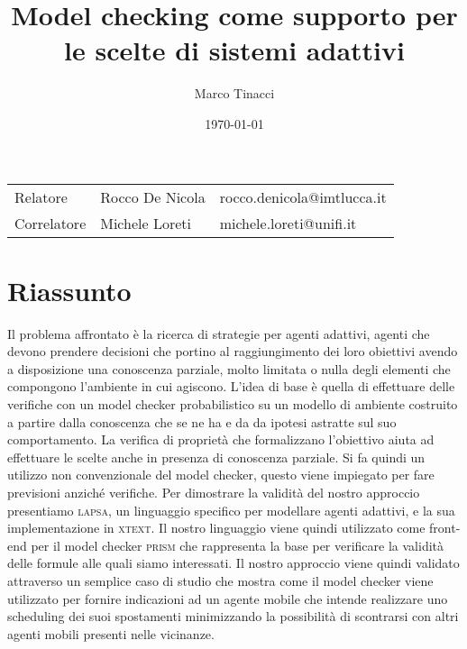 \documentclass[12pt,a4paper]{article}
\author{Marco Tinacci}
\date{\today}
\title{Model checking come supporto per le scelte di sistemi adattivi}
\begin{document}
\maketitle

\begin{tabular}{lll}
	Relatore & Rocco De Nicola & rocco.denicola@imtlucca.it \\
	Correlatore & Michele Loreti & michele.loreti@unifi.it \\
\end{tabular}

\section*{Riassunto}
Il problema affrontato è la ricerca di strategie per agenti adattivi, agenti che devono prendere decisioni che portino al raggiungimento dei loro obiettivi avendo a disposizione una conoscenza parziale, molto limitata o nulla degli elementi che compongono l'ambiente in cui agiscono. L'idea di base è quella di effettuare delle verifiche con un model checker probabilistico su un modello di ambiente costruito a partire dalla conoscenza che se ne ha e da da ipotesi  astratte sul suo comportamento. La verifica di proprietà che formalizzano l'obiettivo aiuta ad effettuare le scelte anche in presenza di conoscenza parziale. Si fa quindi un utilizzo non convenzionale del model checker, questo viene impiegato per fare previsioni anziché verifiche. Per dimostrare la validità del nostro approccio presentiamo \textsc{lapsa}, un linguaggio specifico per modellare agenti adattivi, e la sua implementazione in \textsc{xtext}. Il nostro linguaggio viene quindi utilizzato come front-end per il model checker \textsc{prism} che rappresenta la base per verificare la validità delle formule alle quali siamo interessati. Il nostro approccio viene quindi validato attraverso un semplice caso di studio che mostra come il model checker viene utilizzato per fornire indicazioni ad un agente mobile che intende realizzare uno scheduling dei suoi spostamenti minimizzando la possibilità di scontrarsi con altri agenti mobili presenti nelle vicinanze.
\end{document}
